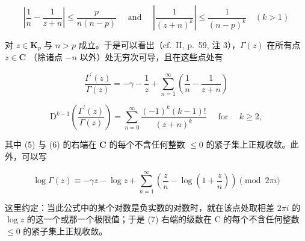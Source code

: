 \[
\left| \frac {1}{n} - \frac {1}{z + n} \right| \leqslant \frac {p}{n (n - p)} \quad \text { and } \quad \left| \frac {1}{(z + n) ^ {k}} \right| \leqslant \frac {1}{(n - p) ^ {k}} \quad (k > 1)
\]

对 \(z \in \mathbf{K}_p\) 与 \(n > p\) 成立。于是可以看出（cf.~II, p.~59, 注 3），\(\Gamma(z)\) 在所有点 \(z \in \mathbf{C}\) （除诸点 \(-n\) 以外）处无穷次可导，且在这些点处有

\[
{\frac {\Gamma^ {\prime} (z)}{\Gamma (z)}} = - \gamma - {\frac {1}{z}} + \sum_ {n = 1} ^ {\infty} \left({\frac {1}{n}} - {\frac {1}{z + n}}\right)\tag{5}
\]

\[
\mathrm{D} ^ {k - 1} \left(\frac {\Gamma^ {\prime} (z)}{\Gamma (z)}\right) = \sum_ {n = 0} ^ {\infty} \frac {(- 1) ^ {k} (k - 1) !}{(z + n) ^ {k}} \quad \text { for } \quad k \geqslant 2,\tag{6}
\]

其中 (5) 与 (6) 的右端在 \(\mathbf{C}\) 的每个不含任何整数 \(\leqslant 0\) 的紧子集上正规收敛。此外，可以写

\[
\log \Gamma (z) \equiv - \gamma z - \log z + \sum_ {n = 1} ^ {\infty} \left(\frac {z}{n} - \log \left(1 + \frac {z}{n}\right)\right) \pmod {2 \pi i}\tag{7}
\]

这里约定：当此公式中的某个对数是负实数的对数时，就在该点处取相差 \(2\pi i\) 的 \(\log z\) 的这一个或那一个极限值；于是 (7) 右端的级数在 C 的每个不含任何整数 \(\leqslant 0\) 的紧子集上正规收敛。

